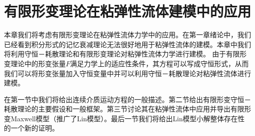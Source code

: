 \chapter{有限形变理论在粘弹性流体建模中的应用}


% 
本章我们将考虑有限形变理论在粘弹性流体力学中的应用。在第一章绪论中，我们已经看到积分形式的记忆衰减理论无法很好地用于粘弹性流体的建模。本章中我们将利用守恒－耗散理论和有限形变理论对粘弹性流体力学进行建模。
由于有限形变理论中的形变张量$F$满足力学上的适应性条件，其方程可以写成守恒形式，从而我们可以将形变张量加入守恒变量中并可以利用守恒－耗散理论对粘弹性流体进行建模。

在第一节中我们将给出连续介质运动方程的一般描述。第二节给出有限形变守恒－耗散理论的主要假设和一般框架。第三节讨论其在粘弹性流体中应用并导出有限形变Maxwell模型（推广了Lin模型）。最后一节我们将给出Lin模型小解整体存在性的一个新的证明。

